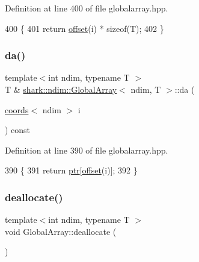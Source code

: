 Definition at line 400 of file globalarray.\+hpp.


\begin{DoxyCode}
400                                                                           \{
401             \textcolor{keywordflow}{return} \hyperlink{classshark_1_1ndim_1_1_global_array_a63c8f10949e3f8d7ffdf532440190ca1}{offset}(i) * \textcolor{keyword}{sizeof}(T);
402         \}
\end{DoxyCode}
\hypertarget{classshark_1_1ndim_1_1_global_array_aeadb9a62b97953c4b7a7a047632d117a}{}\label{classshark_1_1ndim_1_1_global_array_aeadb9a62b97953c4b7a7a047632d117a} 
\subsubsection{\texorpdfstring{da()}{da()}}
{\footnotesize\ttfamily template$<$int ndim, typename T $>$ \\
T \& \hyperlink{classshark_1_1ndim_1_1_global_array}{shark\+::ndim\+::\+Global\+Array}$<$ ndim, T $>$\+::da (\begin{DoxyParamCaption}\item[{\hyperlink{structshark_1_1ndim_1_1coords}{coords}$<$ ndim $>$}]{i }\end{DoxyParamCaption}) const\hspace{0.3cm}{\ttfamily [inline]}}



Definition at line 390 of file globalarray.\+hpp.


\begin{DoxyCode}
390                                                               \{
391             \textcolor{keywordflow}{return} \hyperlink{classshark_1_1ndim_1_1_global_array_ad4af3b8307a3a7107186cf699b5a2432}{ptr}[\hyperlink{classshark_1_1ndim_1_1_global_array_a63c8f10949e3f8d7ffdf532440190ca1}{offset}(i)];
392         \}
\end{DoxyCode}
\hypertarget{classshark_1_1ndim_1_1_global_array_a62353dca76c53cee5fb9cfa5f31cd542}{}\label{classshark_1_1ndim_1_1_global_array_a62353dca76c53cee5fb9cfa5f31cd542} 
\subsubsection{\texorpdfstring{deallocate()}{deallocate()}}
{\footnotesize\ttfamily template$<$int ndim, typename T $>$ \\
void Global\+Array\+::deallocate (\begin{DoxyParamCaption}{ }\end{DoxyParamCaption})\hspace{0.3cm}{\ttfamily [private]}}



